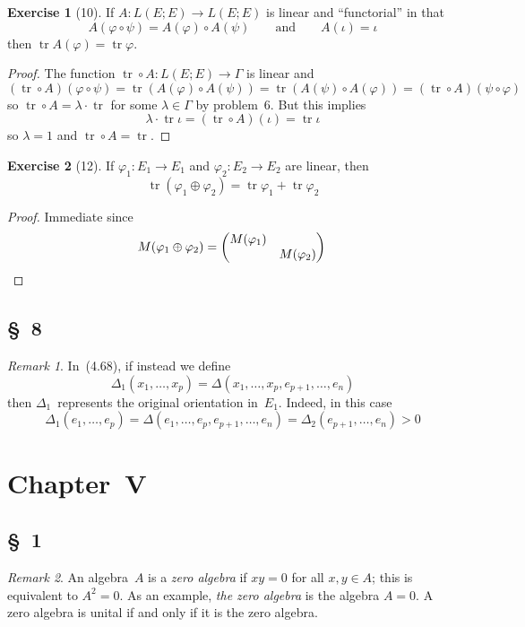 \documentclass[letterpaper,12pt]{article}
\DeclareMathOperator{\tr}{tr}
\newcommand{\after}{\circ}
\newcommand{\dsum}{\oplus}
\newcommand{\mult}{\cdot}
\theoremstyle{definition}
\newtheorem*{exer}{Exercise}
\theoremstyle{remark}
\newtheorem*{rmk}{Remark}
\begin{document}
\begin{exer}[10]
If \(A:L(E;E)\to L(E;E)\) is linear and ``functorial'' in that
\[A(\varphi\after\psi)=A(\varphi)\after A(\psi)\qquad\text{and}\qquad A(\iota)=\iota\]
then \(\tr A(\varphi)=\tr\varphi\).
\end{exer}
\begin{proof}
The function \(\tr\after A:L(E;E)\to\Gamma\) is linear and
\[(\tr\after A)(\varphi\after\psi)=\tr(A(\varphi)\after A(\psi))=\tr(A(\psi)\after A(\varphi))=(\tr\after A)(\psi\after\varphi)\]
so \(\tr\after A=\lambda\mult\tr\) for some \(\lambda\in\Gamma\) by problem~6. But this implies
\[\lambda\mult\tr\iota=(\tr\after A)(\iota)=\tr\iota\]
so \(\lambda=1\) and \(\tr\after A=\tr\).
\end{proof}

\begin{exer}[12]
If \(\varphi_1:E_1\to E_1\) and \(\varphi_2:E_2\to E_2\) are linear, then
\[\tr(\varphi_1\dsum\varphi_2)=\tr\varphi_1+\tr\varphi_2\]
\end{exer}
\begin{proof}
Immediate since
\[M(\varphi_1\dsum\varphi_2)=\begin{pmatrix}
M(\varphi_1)&\\
&M(\varphi_2)
\end{pmatrix}\qedhere\]
\end{proof}

\subsection*{\S~8}
\begin{rmk}
In~(4.68), if instead we define
\[\Delta_1(x_1,\ldots,x_p)=\Delta(x_1,\ldots,x_p,e_{p+1},\ldots,e_n)\]
then \(\Delta_1\)~represents the original orientation in~\(E_1\). Indeed, in this case
\[\Delta_1(e_1,\ldots,e_p)=\Delta(e_1,\ldots,e_p,e_{p+1},\ldots,e_n)=\Delta_2(e_{p+1},\ldots,e_n)>0\]
\end{rmk}

\newpage
\section*{Chapter~V}
\subsection*{\S~1}
\begin{rmk}
An algebra~\(A\) is a \emph{zero algebra} if \(xy=0\) for all \(x,y\in A\); this is equivalent to \(A^2=0\). As an example, \emph{the zero algebra} is the algebra \(A=0\). A zero algebra is unital if and only if it is the zero algebra.
\end{rmk}
\end{document}
